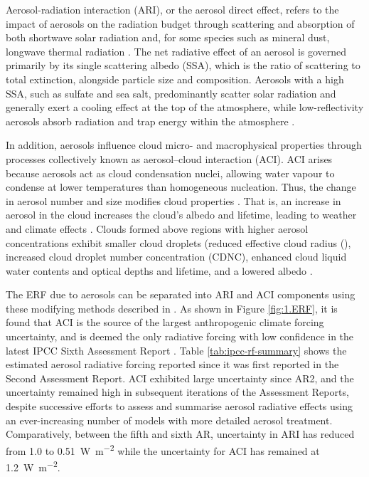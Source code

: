 Aerosol-radiation interaction (ARI), or the aerosol direct effect, refers to the impact of aerosols on the radiation budget through scattering and absorption of both shortwave solar radiation and, for some species such as mineral dust, longwave thermal radiation \citep{bellouinBoundingGlobalAerosol2020,dibiagioDirectRadiativeEffect2020}. The net radiative effect of an aerosol is governed primarily by its single scattering albedo (SSA), which is the ratio of scattering to total extinction, alongside particle size and composition. Aerosols with a high SSA, such as sulfate and sea salt, predominantly scatter solar radiation and generally exert a cooling effect at the top of the atmosphere, while low-reflectivity aerosols absorb radiation and trap energy within the atmosphere \citep{tuccellaModelingBlackBrown2025}.

In addition, aerosols influence cloud micro- and macrophysical properties through processes collectively known as aerosol–cloud interaction (ACI). ACI arises because aerosols act as cloud condensation nuclei, allowing water vapour to condense at lower temperatures than homogeneous nucleation. Thus, the change in aerosol number and size modifies cloud properties \citep[e.g., ][]{rosenfeldGlobalObservationsAerosolcloudprecipitationclimate2014, boucherCloudsAerosols2014,persadAerosolsMustBe2022}. That is, an increase in aerosol in the cloud increases the cloud's albedo and lifetime, leading to weather and climate effects \citep{twomeyInfluencePollutionShortwave1977, albrechtAerosolsCloudMicrophysics1989}. Clouds formed above regions with higher aerosol concentrations exhibit smaller cloud droplets (reduced effective cloud radius (\Reff{}), increased cloud droplet number concentration (CDNC), enhanced cloud liquid water contents and optical depths and lifetime, and a lowered albedo \citep[e.g., ][]{twomeyInfluencePollutionShortwave1977,twohyEvaluationAerosolIndirect2005,rosenfeldGlobalObservationsAerosolcloudprecipitationclimate2014}.


The ERF due to aerosols can be separated into ARI and ACI components using these modifying methods described in \citet{ghanTechnicalNoteEstimating2013}. As shown in Figure \ref{fig:1.ERF}, it is found that ACI is the source of the largest anthropogenic climate forcing uncertainty, and is deemed the only radiative forcing with low confidence in the latest IPCC Sixth Assessment Report \citep{forsterEarthEnergyBudget2021}. Table \ref{tab:ipcc-rf-summary} shows the estimated aerosol radiative forcing reported since it was first reported in the Second Assessment Report. ACI exhibited large uncertainty since AR2, and the uncertainty remained high in subsequent iterations of the Assessment Reports, despite successive efforts to assess and summarise aerosol radiative effects using an ever-increasing number of models with more detailed aerosol treatment. Comparatively, between the fifth and sixth AR, uncertainty in ARI has reduced from 1.0 to \qty{0.51}{\watt\per\metre\squared} while the uncertainty for ACI has remained at \qty{1.2}{\watt\per\metre\squared}. 


